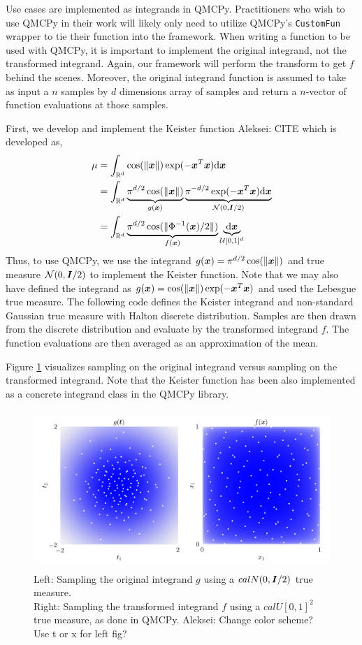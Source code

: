 \documentclass[graybox,footinfo]{svmult}
\newcommand{\AGSComment}[1]{{\color{cyan} Aleksei: #1}}
\begin{document}
Use cases are implemented as integrands in QMCPy. Practitioners who wish to use QMCPy in their work will likely only need to utilize QMCPy's \texttt{CustomFun} wrapper to tie their function into the framework. When writing a function to be used with QMCPy, it is important to implement the original integrand, not the transformed integrand. Again, our framework will perform the transform to get $f$ behind the scenes. Moreover, the original integrand function is assumed to take as input a $n$ samples by $d$ dimensions array of samples and return a $n$-vector of function evaluations at those samples. 

First, we develop and implement the  Keister function \AGSComment{CITE} which is developed as, 
\begin{align*}
\mu 
&= \int_{\mathbb{R}^d} \cos(\lVert {\boldsymbol{x}} \rVert) \exp(-{\boldsymbol{x}}^T {\boldsymbol{x}}) \mathrm{d} {\boldsymbol{x}} \\ 
&= \int_{\mathbb{R}^d} \underbrace{\pi^{d/2} \cos(\lVert {\boldsymbol{x}} \rVert)}_{g({\boldsymbol{x}})} \underbrace{\pi^{-d/2} \exp(-{\boldsymbol{x}}^T {\boldsymbol{x}}) \mathrm{d} {\boldsymbol{x}}}_{{\mathcal{N}}(0,{\boldsymbol{I}}/2)} \\ 
&= \int_{\mathbb{R}^d} \underbrace{\pi^{d/2} \cos(\lVert \Phi^{-1}({\boldsymbol{x}})/2 \rVert)}_{f({\boldsymbol{x}})} \underbrace{\mathrm{d} {\boldsymbol{x}}}_{{\mathcal{U}}[0,1]^d}
\end{align*}
Thus, to use QMCPy, we use the integrand $g({\boldsymbol{x}}) = \pi^{d/2} \cos(\lVert {\boldsymbol{x}} \rVert)$ and true measure ${\mathcal{N}}(0,{\boldsymbol{I}}/2)$ to implement the Keister function. Note that we may also have defined the integrand as $g({\boldsymbol{x}}) = \cos(\lVert {\boldsymbol{x}} \rVert)\exp(-{\boldsymbol{x}}^T{\boldsymbol{x}})$ and used the Lebesgue true measure. The following code defines the Keister integrand and non-standard Gaussian true measure with Halton discrete distribution. Samples are then drawn from the discrete distribution and evaluate by the transformed integrand $f$. The function evaluations are then averaged as an approximation of the mean.

Figure \ref{fig:ikc} visualizes sampling on the original integrand versus sampling on the transformed integrand. Note that the Keister function has been also implemented as a concrete integrand class in the QMCPy library. 
\begin{figure}
	\includegraphics[height=6cm]{ags/figs/i.keister_contours.png}
	\caption{Left: Sampling the original integrand $g$ using a $calN(0,{\boldsymbol{I}}/2)$ true measure. \\ Right: Sampling the transformed integrand $f$ using a $calU[0,1]^2$ true measure, as done in QMCPy. \AGSComment{Change color scheme? Use t or x for left fig?}}
	\label{fig:ikc}
\end{figure}
\end{document}

